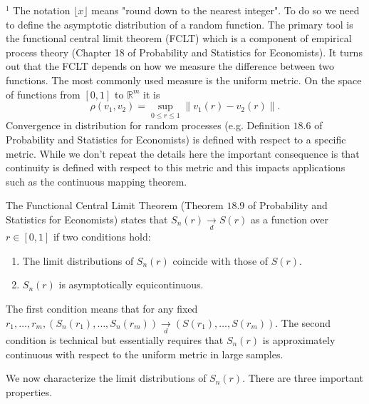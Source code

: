 \documentclass[10pt]{article}
\begin{document}
${ }^{1}$ The notation $\lfloor x\rfloor$ means "round down to the nearest integer". To do so we need to define the asymptotic distribution of a random function. The primary tool is the functional central limit theorem (FCLT) which is a component of empirical process theory (Chapter 18 of Probability and Statistics for Economists). It turns out that the FCLT depends on how we measure the difference between two functions. The most commonly used measure is the uniform metric. On the space of functions from $[0,1]$ to $\mathbb{R}^{m}$ it is
$$
\rho\left(v_{1}, v_{2}\right)=\sup _{0 \leq r \leq 1}\left\|v_{1}(r)-v_{2}(r)\right\| .
$$
Convergence in distribution for random processes (e.g. Definition $18.6$ of Probability and Statistics for Economists) is defined with respect to a specific metric. While we don't repeat the details here the important consequence is that continuity is defined with respect to this metric and this impacts applications such as the continuous mapping theorem.

The Functional Central Limit Theorem (Theorem $18.9$ of Probability and Statistics for Economists) states that $S_{n}(r) \underset{d}{\longrightarrow} S(r)$ as a function over $r \in[0,1]$ if two conditions hold:

\begin{enumerate}
  \item The limit distributions of $S_{n}(r)$ coincide with those of $S(r)$.

  \item $S_{n}(r)$ is asymptotically equicontinuous.

\end{enumerate}
The first condition means that for any fixed $r_{1}, \ldots, r_{m},\left(S_{n}\left(r_{1}\right), \ldots, S_{n}\left(r_{m}\right)\right) \underset{d}{\longrightarrow}\left(S\left(r_{1}\right), \ldots, S\left(r_{m}\right)\right)$. The second condition is technical but essentially requires that $S_{n}(r)$ is approximately continuous with respect to the uniform metric in large samples.

We now characterize the limit distributions of $S_{n}(r)$. There are three important properties.
\end{document}
